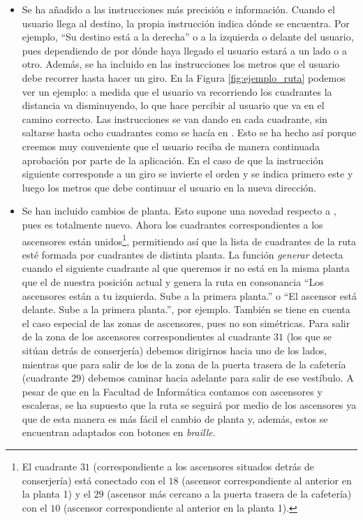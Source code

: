 \begin{itemize}
	\item Se ha añadido a las instrucciones más precisión e información. Cuando el usuario llega al destino, la propia instrucción indica dónde se encuentra. Por ejemplo, ``Su destino está a la derecha'' o a la izquierda o delante del usuario, pues dependiendo de por dónde haya llegado el usuario estará a un lado o a otro. Además, se ha incluido en las instrucciones los metros que el usuario debe recorrer hasta hacer un giro. En la Figura \ref{fig:ejemplo_ruta} podemos ver un ejemplo: a medida que el usuario va recorriendo los cuadrantes la distancia va disminuyendo, lo que hace percibir al usuario que va en el camino correcto. Las instrucciones se van dando en cada cuadrante, sin saltarse hasta ocho cuadrantes como se hacía en \cite{TFGguia}. Esto se ha hecho así porque creemos muy conveniente que el usuario reciba de manera continuada aprobación por parte de la aplicación. En el caso de que la instrucción siguiente corresponde a un giro se invierte el orden y se indica primero este y luego los metros que debe continuar el usuario en la nueva dirección.
	
	
	\item Se han incluido cambios de planta. Esto supone una novedad respecto a \cite{TFGguia}, pues es totalmente nuevo. Ahora los cuadrantes correspondientes a los ascensores están unidos\footnote{El cuadrante $31$ (correspondiente a los ascensores situados detrás de conserjería) está conectado con el $18$ (ascensor correspondiente al anterior en la planta 1) y el $29$ (ascensor más cercano a la puerta trasera de la cafetería) con el $10$ (ascensor correspondiente al anterior en la planta 1).}, permitiendo así que la lista de cuadrantes de la ruta esté formada por cuadrantes de distinta planta. La función \textit{generar} detecta cuando el siguiente cuadrante al que queremos ir no está en la misma planta que el de nuestra posición actual y genera la ruta en consonancia ``Los ascensores están a tu izquierda. Sube a la primera planta.'' o ``El ascensor está delante. Sube a la primera planta.'', por ejemplo. También se tiene en cuenta el caso especial de las zonas de ascensores, pues no son simétricas. Para salir de la zona de los ascensores correspondientes al cuadrante $31$ (los que se sitúan detrás de conserjería) debemos dirigirnos hacia uno de los lados, mientras que para salir de los de la zona de la puerta trasera de la cafetería (cuadrante $29$) debemos caminar hacia adelante para salir de ese vestíbulo. A pesar de que en la Facultad de Informática contamos con ascensores y escaleras, se ha supuesto que la ruta se seguirá por medio de los ascensores ya que de esta manera es más fácil el cambio de planta y, además, estos se encuentran adaptados con botones en \textit{braille}.
	

\end{itemize}
